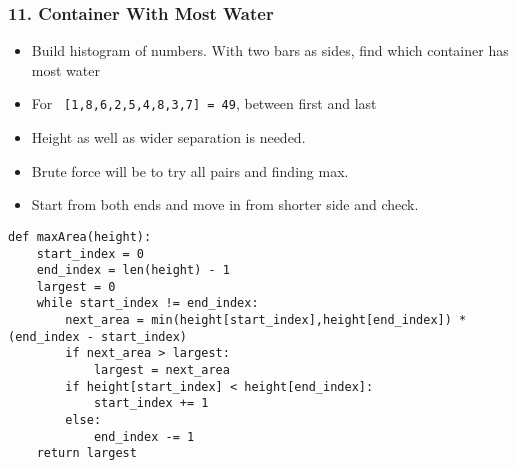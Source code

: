 \begin{frame}[fragile]\frametitle{11. Container With Most Water}


	\begin{itemize}
	\item Build histogram of numbers. With two bars as sides, find which container has most water
	\item For \lstinline{ [1,8,6,2,5,4,8,3,7] = 49}, between first and last
	\item Height as well as wider separation is needed.
	\item Brute force will be to try all pairs and finding max.
	\item Start from both ends and move in from shorter side and check.
	\end{itemize}

		\begin{lstlisting}[basicstyle=\scriptsize]
def maxArea(height):
    start_index = 0
    end_index = len(height) - 1
    largest = 0
    while start_index != end_index:
        next_area = min(height[start_index],height[end_index]) * (end_index - start_index)
        if next_area > largest:
            largest = next_area
        if height[start_index] < height[end_index]:
            start_index += 1
        else:
            end_index -= 1
    return largest
				\end{lstlisting}		

	
\end{frame}

